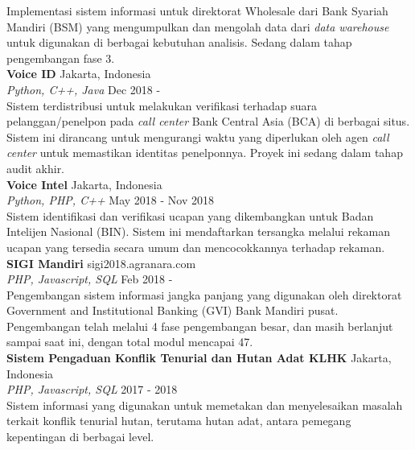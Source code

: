 \documentclass[a4paper]{article}
\begin{document}
Implementasi sistem informasi untuk direktorat Wholesale dari Bank Syariah
Mandiri (BSM) yang mengumpulkan dan mengolah data dari \textit{data warehouse}
untuk digunakan di berbagai kebutuhan analisis. Sedang dalam tahap pengembangan
fase 3. \\
\vspace*{3mm}
{\textbf{Voice ID}} \hfill Jakarta, Indonesia \\
{\sl Python, C++, Java} \hfill Dec 2018 - \\
\vspace*{1mm}
Sistem terdistribusi untuk melakukan verifikasi terhadap suara
pelanggan/penelpon pada \textit{call center} Bank Central Asia (BCA) di berbagai
situs. Sistem ini dirancang untuk mengurangi waktu yang diperlukan oleh agen
\textit{call center} untuk memastikan identitas penelponnya. Proyek ini sedang
dalam tahap audit akhir.\\
\vspace*{3mm}
{\textbf{Voice Intel}} \hfill Jakarta, Indonesia \\
{\sl Python, PHP, C++} \hfill May 2018 - Nov 2018 \\
\vspace*{1mm}
Sistem identifikasi dan verifikasi ucapan yang dikembangkan untuk Badan
Intelijen Nasional (BIN). Sistem ini mendaftarkan tersangka melalui rekaman
ucapan yang tersedia secara umum dan mencocokkannya terhadap rekaman. \\
\vspace*{3mm}
{\textbf{SIGI Mandiri}}  \hfill sigi2018.agranara.com\\
{\sl PHP, Javascript, SQL} \hfill Feb 2018 - \\
\vspace*{1mm}
Pengembangan sistem informasi jangka panjang yang digunakan oleh direktorat
Government and Institutional Banking (GVI) Bank Mandiri pusat. Pengembangan
telah melalui 4 fase pengembangan besar, dan masih berlanjut sampai saat ini,
dengan total modul mencapai 47. \\
\vspace*{3mm}
{\textbf{Sistem Pengaduan Konflik Tenurial dan Hutan Adat KLHK}}  \hfill Jakarta, Indonesia\\
{\sl PHP, Javascript, SQL} \hfill 2017 - 2018\\
\vspace*{1mm}
Sistem informasi yang digunakan untuk memetakan dan menyelesaikan masalah
terkait konflik tenurial hutan, terutama hutan adat, antara pemegang kepentingan di
berbagai level. \\
\end{document}

